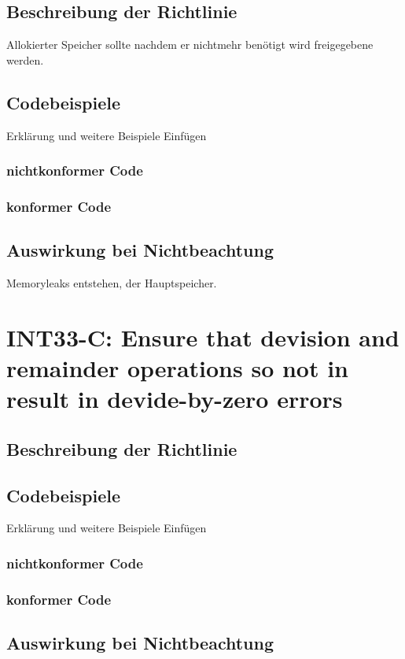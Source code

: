 \documentclass[12pt]{article}
\begin{document}
\subsection{Beschreibung der Richtlinie}
Allokierter Speicher sollte nachdem er nichtmehr benötigt wird freigegebene werden.
\subsection{Codebeispiele}
Erklärung und weitere Beispiele Einfügen
\subsubsection{nichtkonformer Code}

\subsubsection{konformer Code}


\subsection{Auswirkung bei Nichtbeachtung}
Memoryleaks entstehen, der Hauptspeicher.


\newpage
\section{INT33-C: Ensure that devision and remainder operations so not in result in devide-by-zero errors}
\subsection{Beschreibung der Richtlinie}
\subsection{Codebeispiele}
Erklärung und weitere Beispiele Einfügen
\subsubsection{nichtkonformer Code}

\subsubsection{konformer Code}


\subsection{Auswirkung bei Nichtbeachtung}
\end{document}
